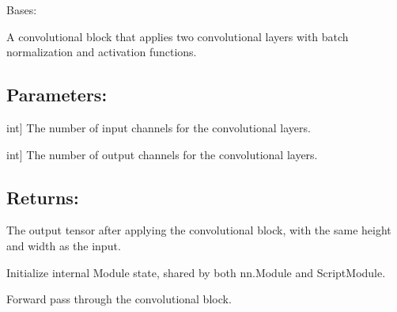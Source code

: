 \documentclass[a4paper,10pt,english]{sphinxmanual}
\begin{document}
\begin{fulllineitems}
\label{\detokenize{models:fireDiff.Models.unet.ConvBlock}}
\pysigstartsignatures
{}
\pysigstopsignatures
\sphinxAtStartPar
Bases: 

\sphinxAtStartPar
A convolutional block that applies two convolutional layers with batch
normalization and activation functions.


\subsection{Parameters:}
\label{\detokenize{models:id3}}\begin{description}
\sphinxlineitem{in\_channels}{[}int{]}
\sphinxAtStartPar
The number of input channels for the convolutional layers.

\sphinxlineitem{out\_channels}{[}int{]}
\sphinxAtStartPar
The number of output channels for the convolutional layers.

\end{description}


\subsection{Returns:}
\label{\detokenize{models:id4}}\begin{description}
\sphinxAtStartPar
The output tensor after applying the convolutional block, with the
same height and width as the input.

\end{description}

\sphinxAtStartPar
Initialize internal Module state, shared by both nn.Module and ScriptModule.

\begin{fulllineitems}
\label{\detokenize{models:fireDiff.Models.unet.ConvBlock.forward}}
\pysigstartsignatures
{}
\pysigstopsignatures
\sphinxAtStartPar
Forward pass through the convolutional block.



\end{fulllineitems}
\end{fulllineitems}
\end{document}
